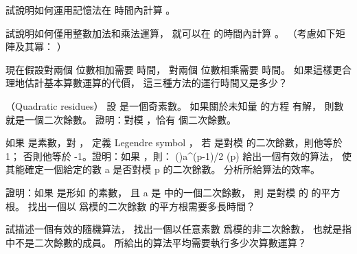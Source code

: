 \startANSWER
{}
\stopANSWER

\startigBase[continue]\startitem
試說明如何運用記憶法在  時間內計算 。
\stopitem\stopigBase

\startANSWER
{}
\stopANSWER

\startigBase[continue]\startitem
試說明如何僅用整數加法和乘法運算，
就可以在  的時間內計算 。
（\hint 考慮如下矩陣及其冪：
\startformula
\left[\startmatrix
\NC 0 \NC 1 \NR
\NC 1 \NC 1 \NR
\stopmatrix\right]
\stopformula）
\stopitem\stopigBase

\startANSWER
{}
\stopANSWER

\startigBase[continue]\startitem
現在假設對兩個 \m{\beta} 位數相加需要 \m{\Theta(\beta)} 時間，
對兩個 \m{\beta} 位數相乘需要  時間。
如果這樣更合理地估計基本算數運算的代價，
這三種方法的運行時間又是多少？
\stopitem\stopigBase

\startANSWER
{}
\stopANSWER
\stopPROBLEM

\startPROBLEM
（Quadratic residues）
設  是一個奇素數。
如果關於未知量  的方程  有解，
則數  就是一個{\EMP 二次餘數}。
\startigBase[a]\startitem
證明：對模 ，恰有  個二次餘數。
\stopitem\stopigBase

\startANSWER
{}
\stopANSWER

\startigBase[continue]\startitem
如果  是素數，對 ，
定義 {\EMP  Legendre symbol} ，
若  是對模  的二次餘數，則他等於 1；
否則他等於 -1。證明：如果 ，則：
\startformula
\left(\right)\equiv a^{(p-1)/2} (\mod p)
\stopformula
給出一個有效的算法，
使其能確定一個給定的數 a 是否對模 p 的二次餘數。
分析所給算法的效率。
\stopitem\stopigBase

\startANSWER
{}
\stopANSWER

\startigBase[continue]\startitem
證明：如果  是形如  的素數，
且 a 是  中的一個二次餘數，
則  是對模  的  的平方根。
找出一個以  爲模的二次餘數  的平方根需要多長時間？
\stopitem\stopigBase

\startANSWER
{}
\stopANSWER

\startigBase[continue]\startitem
試描述一個有效的隨機算法，
找出一個以任意素數  爲模的非二次餘數，
也就是指  中不是二次餘數的成員。
所給出的算法平均需要執行多少次算數運算？
\stopitem\stopigBase

\startANSWER
{}
\stopANSWER
\stopPROBLEM

\stopsubject%
